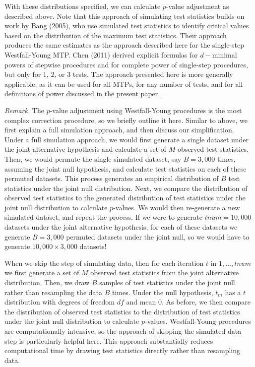 \documentclass[
]{article}
\begin{document}
With these distributions specified, we can calculate \(p\)-value
adjustment as described above. Note that this approach of simulating
test statistics builds on work by Bang (2005), who use simulated test
statistics to identify critical values based on the distribution of the
maximum test statistics. Their approach produces the same estimates as
the approach described here for the single-step Westfall-Young MTP. Chen
(2011) derived explicit formulas for \(d-\)minimal powers of stepwise
procedures and for complete power of single-step procedures, but only
for \(1\), \(2\), or \(3\) tests. The approach presented here is more
generally applicable, as it can be used for all MTPs, for any number of
tests, and for all definitions of power discussed in the present paper.

\emph{Remark.} The \(p\)-value adjustment using Westfall-Young
procedures is the most complex correction procedure, so we briefly
outline it here. Similar to above, we first explain a full simulation
approach, and then discuss our simplification. Under a full simulation
approach, we would first generate a single dataset under the joint
alternative hypothesis and calculate a set of \(M\) observed test
statistics. Then, we would permute the single simulated dataset, say
\(B = 3,000\) times, assuming the joint null hypothesis, and calculate
test statistics on each of these permuted datasets. This process
generates an empirical distribution of \(B\) test statistics under the
joint null distribution. Next, we compare the distribution of observed
test statistics to the generated distribution of test statistics under
the joint null distribution to calculate \(p\)-values. We would then
re-generate a new simulated dataset, and repeat the process. If we were
to generate \(tnum = 10,000\) datasets under the joint alternative
hypothesis, for each of these datasets we generate \(B = 3,000\)
permuted datasets under the joint null, so we would have to generate
\(10,000 \times 3,000\) datasets!

When we skip the step of simulating data, then for each iteration \(t\)
in \(1, \dots, tnum\) we first generate a set of \(M\) observed test
statistics from the joint alternative distribution. Then, we draw \(B\)
samples of test statistics under the joint null rather than resampling
the data \(B\) times. Under the null hypothesis, \(t_m\) has a \(t\)
distribution with degrees of freedom \(df\) and mean \(0\). As before,
we then compare the distribution of observed test statistics to the
distribution of test statistics under the joint null distribution to
calculate \(p\)-values. Westfall-Young procedures are computationally
intensive, so the approach of skipping the simulated data step is
particularly helpful here. This approach substantially reduces
computational time by drawing test statistics directly rather than
resampling data.
\end{document}
